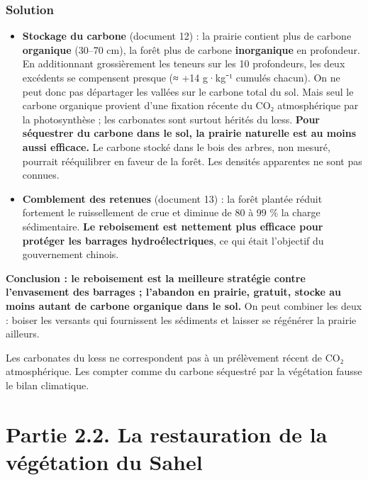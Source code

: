 \documentclass[11pt,a4paper]{article}
\providecommand{\tightlist}{\setlength{\itemsep}{0pt}\setlength{\parskip}{0pt}}
\begin{document}
\hypertarget{solution-36}{%
\subsubsection{Solution}\label{solution-36}}

\begin{itemize}
\tightlist
\item
  \textbf{Stockage du carbone} (document 12) : la prairie contient plus de carbone \textbf{organique} (30--70 cm), la forêt plus de carbone \textbf{inorganique} en profondeur. En additionnant grossièrement les teneurs sur les 10 profondeurs, les deux excédents se compensent presque (≈ +14 g·kg⁻¹ cumulés chacun). On ne peut donc pas départager les vallées sur le carbone total du sol. Mais seul le carbone organique provient d'une fixation récente du CO₂ atmosphérique par la photosynthèse ; les carbonates sont surtout hérités du lœss. \textbf{Pour séquestrer du carbone dans le sol, la prairie naturelle est au moins aussi efficace.} Le carbone stocké dans le bois des arbres, non mesuré, pourrait rééquilibrer en faveur de la forêt. Les densités apparentes ne sont pas connues.
\item
  \textbf{Comblement des retenues} (document 13) : la forêt plantée réduit fortement le ruissellement de crue et diminue de 80 à 99 \% la charge sédimentaire. \textbf{Le reboisement est nettement plus efficace pour protéger les barrages hydroélectriques}, ce qui était l'objectif du gouvernement chinois.
\end{itemize}

\textbf{Conclusion : le reboisement est la meilleure stratégie contre l'envasement des barrages ; l'abandon en prairie, gratuit, stocke au moins autant de carbone organique dans le sol.} On peut combiner les deux : boiser les versants qui fournissent les sédiments et laisser se régénérer la prairie ailleurs.

\begin{piege}

Les carbonates du lœss ne correspondent pas à un prélèvement récent de CO₂ atmosphérique. Les compter comme du carbone séquestré par la végétation fausse le bilan climatique.

\end{piege}

\hypertarget{partie-2.2.-la-restauration-de-la-vuxe9guxe9tation-du-sahel}{%
\section{Partie 2.2. La restauration de la végétation du Sahel}\label{partie-2.2.-la-restauration-de-la-vuxe9guxe9tation-du-sahel}}
\end{document}
